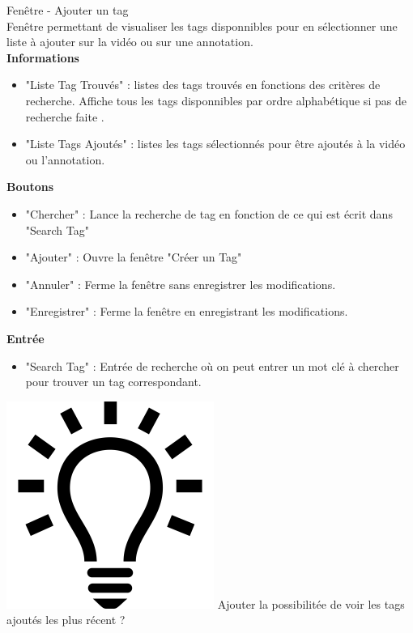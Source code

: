 \documentclass[11pt,french,a4paper]{report}
\begin{document}
\begin{multicols}{2}
\begin{small}
\Large Fenêtre - Ajouter un tag\normalsize \\
    Fenêtre permettant de visualiser les tags disponnibles pour en sélectionner une liste à ajouter sur la vidéo
    ou sur une annotation. \\
\large \textbf{Informations}\normalsize
    \begin{itemize}[label=, leftmargin=*,parsep=0cm,itemsep=0cm,topsep=0cm]
        \item "Liste Tag Trouvés" : listes des tags trouvés en fonctions des critères de recherche.
        Affiche tous les tags disponnibles par ordre alphabétique si pas de recherche faite .
        \item "Liste Tags Ajoutés" : listes les tags sélectionnés pour être ajoutés à la vidéo ou l'annotation.
    \end{itemize}
\large \textbf{Boutons} \normalsize
    \begin{itemize}[label=, leftmargin=*,parsep=0cm,itemsep=0cm,topsep=0cm]
        \item "Chercher" : Lance la recherche de tag en fonction de ce qui est écrit dans "Search Tag"
        \item "Ajouter" : Ouvre la fenêtre  "Créer un Tag"
        \item "Annuler" : Ferme la fenêtre sans enregistrer les modifications.
        \item "Enregistrer" : Ferme la fenêtre en enregistrant les modifications.
    \end{itemize}
\large \textbf{Entrée}\normalsize
    \begin{itemize}[label=, leftmargin=*,parsep=0cm,itemsep=0cm,topsep=0cm]
        \item "Search Tag" : Entrée de recherche où on peut entrer un mot clé à chercher pour trouver un tag correspondant.
    \end{itemize}
    \includegraphics[scale=0.05]{../images/logo/logo_ampoule} Ajouter la possibilitée de voir les tags ajoutés 
            les plus récent ? \\ 



\end{small}
\end{multicols}
\end{document}

